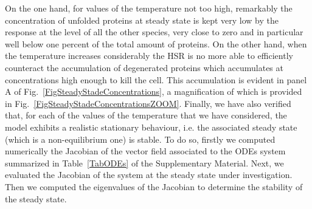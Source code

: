 \documentclass[oneside, 10pt, a4paper, twocolumn]{article}
\begin{document}
On the one hand, for values of the temperature not too high, remarkably the concentration of unfolded proteins at steady state is kept very low by the response at the level of all the other species, very close to zero and in particular well below one percent of the total amount of proteins. 
On the other hand, when the temperature increases considerably the HSR is no more able to efficiently counteract the accumulation of degenerated proteins which accumulates at concentrations high enough to kill the cell. This accumulation is evident in panel A of Fig.~\ref{FigSteadyStadeConcentrations}, a magnification of which is provided in Fig.~\ref{FigSteadyStadeConcentrationsZOOM}.
Finally, we have also verified 
that, for each of the values of the temperature that we have considered, the model exhibits a realistic stationary behaviour, i.e. the associated steady state (which is a non-equilibrium one) is stable. 
To do so, firstly we computed numerically the Jacobian of the vector field associated to the ODEs system summarized in Table~\ref{TabODEs} of the Supplementary Material. 
Next, we evaluated the Jacobian of the system at the steady state 
under investigation.
Then we computed the eigenvalues of the Jacobian to determine the stability of the steady state. 
\end{document}
